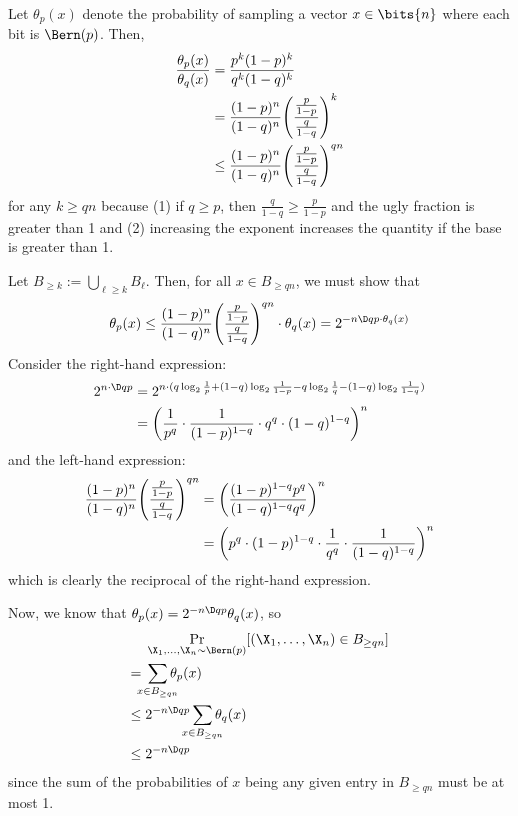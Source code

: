 \documentclass[class=co432,notes,tikz]{agony}
\begin{document}
\begin{prf}
  Let $\theta_p(x)$ denote the probability of sampling a vector $x \in \bits{n}$
  where each bit is \iid $\Bern(p)$.
  Then,
  \begin{align*}
    \frac{\theta_p(x)}{\theta_q(x)}
     & = \frac{p^k(1-p)^k}{q^k(1-q)^k}                                            \\
     & = \frac{(1-p)^n}{(1-q)^n}\qty(\frac{\frac{p}{1-p}}{\frac{q}{1-q}})^k       \\
     & \leq \frac{(1-p)^n}{(1-q)^n}\qty(\frac{\frac{p}{1-p}}{\frac{q}{1-q}})^{qn}
  \end{align*}
  for any $k \geq qn$ because (1)
  if $q \geq p$, then $\frac{q}{1-q} \geq \frac{p}{1-p}$
  and the ugly fraction is greater than 1
  and (2) increasing the exponent increases the quantity if the base is greater than 1.

  Let $B_{\geq k} := \bigcup_{\ell \geq k} B_\ell$.
  Then, for all $x \in B_{\geq qn}$, we must show that
  \begin{align*}
    \theta_p(x) \leq \frac{(1-p)^n}{(1-q)^n}\qty(\frac{\frac{p}{1-p}}{\frac{q}{1-q}})^{qn} \cdot \theta_q(x)
    = 2^{-n\D q p\cdot \theta_q(x)}
  \end{align*}
  Consider the right-hand expression:
  \begin{align*}
    2^{n \cdot \D q p}
     & = 2^{n \cdot (q\log_2\frac1p + (1-q)\log_2\frac{1}{1-p} - q\log_2\frac1q - (1-q)\log_2\frac{1}{1-q})} \\
     & = \qty(\frac{1}{p^q} \cdot \frac{1}{(1-p)^{1-q}} \cdot q^q \cdot (1-q)^{1-q})^n                       \\
  \end{align*}
  and the left-hand expression:
  \begin{align*}
    \frac{(1-p)^n}{(1-q)^n}\qty(\frac{\frac{p}{1-p}}{\frac{q}{1-q}})^{qn}
     & = \qty(\frac{(1-p)^{1-q}p^q}{(1-q)^{1-q}q^q})^n                                 \\
     & = \qty(p^q \cdot (1-p)^{1-q} \cdot \frac{1}{q^q} \cdot \frac{1}{(1-q)^{1-q}})^n
  \end{align*}
  which is clearly the reciprocal of the right-hand expression.

  Now, we know that $\theta_p(x) = 2^{-n\D q p}\theta_q(x)$, so
  \begin{align*}
           & \Pr_{\X_1,\dotsc,\X_n \sim \Bern(p)}[(\X_1,\dotsc,\X_n) \in B_{\geq qn}] \\
    ={}    & \sum_{\mathclap{x \in B_{\geq qn}}} \theta_p(x)                          \\
    \leq{} & 2^{-n\D q p}\sum_{\mathclap{x \in B_{\geq qn}}}\theta_q(x)               \\
    \leq{} & 2^{-n\D q p}
  \end{align*}
  since the sum of the probabilities of $x$ being any given entry in $B_{\geq qn}$
  must be at most 1.
\end{prf}
\end{document}
